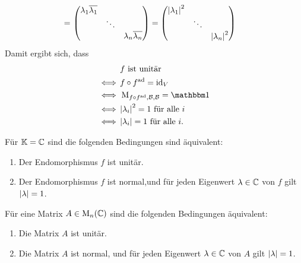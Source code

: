 \begin{align*}
  =&\,  \begin{pmatrix}
          \lambda_1 \overline{\lambda_1} &         &                                 \\
                                          & \ddots  &                                 \\
                                          &         & \lambda_n \overline{\lambda_n}
        \end{pmatrix}
  =     \begin{pmatrix}
          \left| \lambda_1 \right|^2 &         &                   \\
                            & \ddots  &                   \\
                            &         & \left| \lambda_n \right|^2
        \end{pmatrix}
\end{align*}
Damit ergibt sich, dass
\begin{align*}
      &\, \text{$f$ ist unitär}
  \\
  \iff&\, f \circ \adj{f} = \id_V
  \\
  \iff&\, \repmatrixendo{f \circ \adj{f}}{\basis{B}} = \Id
  \\
  \iff&\, \text{$\abs{\lambda_i}^2 = 1$ für alle $i$}
  \\
  \iff&\, \text{$\abs{\lambda_i} = 1$ für alle $i$}.
\end{align*}

\begin{theorem}
  Für $\mathbb{K} = \mathbb{C}$ sind die folgenden Bedingungen sind äquivalent:
  \begin{enumerate}
    \item
      Der Endomorphismus $f$ ist unitär.
    \item
      Der Endomorphismus $f$ ist normal,und für jeden Eigenwert $\lambda \in \mathbb{C}$ von $f$ gilt $\left| \lambda \right| = 1$.
  \end{enumerate}
\end{theorem}

\begin{corollary}
  Für eine Matrix $A \in \operatorname{M}_{n}(\mathbb{C})$ sind die folgenden Bedingungen äquivalent:
  \begin{enumerate}
    \item
      Die Matrix $A$ ist unitär.
    \item
      Die Matrix $A$ ist normal, und für jeden Eigenwert $\lambda \in \mathbb{C}$ von $A$ gilt $\left| \lambda \right| = 1$.
  \end{enumerate}
\end{corollary}



